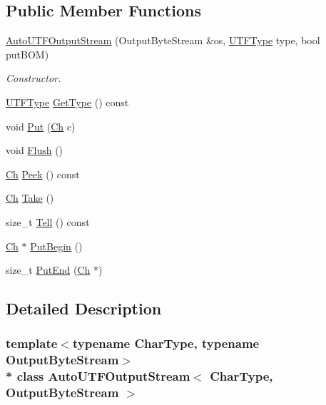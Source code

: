 \subsection*{Public Member Functions}
\begin{DoxyCompactItemize}
\item 
\hyperlink{classAutoUTFOutputStream_a2fe7dbc8e43d11295f66df5653148137}{Auto\+U\+T\+F\+Output\+Stream} (Output\+Byte\+Stream \&os, \hyperlink{encodings_8h_ac9448aedf514a5bb509bae73a9ce4e58}{U\+T\+F\+Type} type, bool put\+B\+OM)
\begin{DoxyCompactList}\small\item\em Constructor. \end{DoxyCompactList}\item 
\hyperlink{encodings_8h_ac9448aedf514a5bb509bae73a9ce4e58}{U\+T\+F\+Type} \hyperlink{classAutoUTFOutputStream_ac0b150bc3a52534c0e076a02c7708de3}{Get\+Type} () const 
\item 
void \hyperlink{classAutoUTFOutputStream_ad12b33e48c45bdbf2628fd3d5461041a}{Put} (\hyperlink{classAutoUTFOutputStream_abd8c486101026e11828e86c18991c9c0}{Ch} c)
\item 
void \hyperlink{classAutoUTFOutputStream_a38b54c84ba0c479552256ac092529f47}{Flush} ()
\item 
\hyperlink{classAutoUTFOutputStream_abd8c486101026e11828e86c18991c9c0}{Ch} \hyperlink{classAutoUTFOutputStream_ae94659ad6b20e4a89d59a8c98ea6b580}{Peek} () const 
\item 
\hyperlink{classAutoUTFOutputStream_abd8c486101026e11828e86c18991c9c0}{Ch} \hyperlink{classAutoUTFOutputStream_a44ee7d84ba13fece17574d01b7be574b}{Take} ()
\item 
size\+\_\+t \hyperlink{classAutoUTFOutputStream_a63ab76ef57db6ab2c2899173e916a6a9}{Tell} () const 
\item 
\hyperlink{classAutoUTFOutputStream_abd8c486101026e11828e86c18991c9c0}{Ch} $\ast$ \hyperlink{classAutoUTFOutputStream_a3c7333661dba3d2210f0b287bdd6c1f3}{Put\+Begin} ()
\item 
size\+\_\+t \hyperlink{classAutoUTFOutputStream_a4b16bda191526c894501fce447e95b8d}{Put\+End} (\hyperlink{classAutoUTFOutputStream_abd8c486101026e11828e86c18991c9c0}{Ch} $\ast$)
\end{DoxyCompactItemize}


\subsection{Detailed Description}
\subsubsection*{template$<$typename Char\+Type, typename Output\+Byte\+Stream$>$\\*
class Auto\+U\+T\+F\+Output\+Stream$<$ Char\+Type, Output\+Byte\+Stream $>$}

